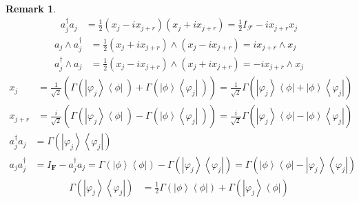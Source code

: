 \documentclass[aps,preprint]{revtex4}%
\newtheorem{remark}[theorem]{Remark}
\begin{document}
\begin{remark}
\begin{align}
a_{j}^{\dagger}a_{j}  &  =\frac{1}{2}\left(  x_{j}-ix_{j+r}\right)  \left(
x_{j}+ix_{j+r}\right)  =\frac{1}{2}I_{\mathcal{F}}-ix_{j+r}x_{j}%
\end{align}%
\begin{align}
a_{j}\wedge a_{j}^{\dagger}  &  =\frac{1}{2}\left(  x_{j}+ix_{j+r}\right)
\wedge\left(  x_{j}-ix_{j+r}\right)  =ix_{j+r}\wedge x_{j}\\
a_{j}^{\dagger}\wedge a_{j}  &  =\frac{1}{2}\left(  x_{j}-ix_{j+r}\right)
\wedge\left(  x_{j}+ix_{j+r}\right)  =-ix_{j+r}\wedge x_{j}%
\end{align}%
\begin{align}
x_{j}  &  =\frac{1}{\sqrt{2}}\left(  \overset{}{\Gamma\left(  \left\vert
\varphi_{j}\right\rangle \left\langle \phi\right\vert \ \right)
+\Gamma\left(  \left\vert \phi\right\rangle \left\langle \varphi
_{j}\right\vert \ \right)  }\right)  =\frac{1}{\sqrt{2}}\Gamma\left(
\overset{}{\left\vert \varphi_{j}\right\rangle \left\langle \phi\right\vert
+\left\vert \phi\right\rangle \left\langle \varphi_{j}\right\vert }\right) \\
x_{j+r}  &  =\frac{i}{\sqrt{2}}\left(  \overset{}{\Gamma\left(  \left\vert
\varphi_{j}\right\rangle \left\langle \phi\right\vert \ \right)
-\Gamma\left(  \left\vert \phi\right\rangle \left\langle \varphi
_{j}\right\vert \ \right)  }\right)  =\frac{i}{\sqrt{2}}\Gamma\left(
\overset{}{\left\vert \varphi_{j}\right\rangle \left\langle \phi\right\vert
-\left\vert \phi\right\rangle \left\langle \varphi_{j}\right\vert }\right)
\end{align}%
\begin{align}
a_{j}^{\dagger}a_{j}  &  =\Gamma\left(  \left\vert \varphi_{j}\right\rangle
\left\langle \varphi_{j}\right\vert \right) \\
a_{j}a_{j}^{\dagger}  &  =I_{\boldsymbol{F}}-a_{j}^{\dagger}a_{j}%
=\Gamma\left(  \left\vert \phi\right\rangle \left\langle \phi\right\vert
\right)  -\Gamma\left(  \left\vert \varphi_{j}\right\rangle \left\langle
\varphi_{j}\right\vert \right)  =\Gamma\left(  \left\vert \phi\right\rangle
\left\langle \phi\right\vert -\left\vert \varphi_{j}\right\rangle \left\langle
\varphi_{j}\right\vert \right)
\end{align}%
\begin{align}
\Gamma\left(  \left\vert \varphi_{j}\right\rangle \left\langle \varphi
_{j}\right\vert \right)   &  =\frac{1}{2}\Gamma\left(  \left\vert
\phi\right\rangle \left\langle \phi\right\vert \right)  +\Gamma\left(
\left\vert \varphi_{j}\right\rangle \left\langle \phi\right\vert \right)

\end{align}
\end{remark}
\end{document}
